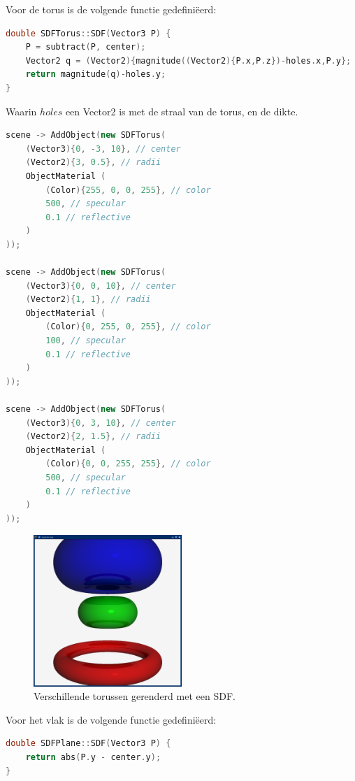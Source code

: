 \documentclass[12pt, a4paper]{article}
\begin{document}
Voor de torus is de volgende functie gedefiniëerd:
\begin{lstlisting}[language=C++]
double SDFTorus::SDF(Vector3 P) {
    P = subtract(P, center);
    Vector2 q = (Vector2){magnitude((Vector2){P.x,P.z})-holes.x,P.y};
    return magnitude(q)-holes.y;
}
\end{lstlisting}

Waarin $holes$ een Vector2 is met de straal van de torus, en de dikte.


\begin{lstlisting}[language=C++]
scene -> AddObject(new SDFTorus(
    (Vector3){0, -3, 10}, // center
    (Vector2){3, 0.5}, // radii
    ObjectMaterial (
        (Color){255, 0, 0, 255}, // color
        500, // specular
        0.1 // reflective
    )
));

scene -> AddObject(new SDFTorus(
    (Vector3){0, 0, 10}, // center
    (Vector2){1, 1}, // radii
    ObjectMaterial (
        (Color){0, 255, 0, 255}, // color
        100, // specular
        0.1 // reflective
    )
));

scene -> AddObject(new SDFTorus(
    (Vector3){0, 3, 10}, // center
    (Vector2){2, 1.5}, // radii
    ObjectMaterial (
        (Color){0, 0, 255, 255}, // color
        500, // specular
        0.1 // reflective
    )
));
\end{lstlisting}

\begin{figure}[h]
    \centering
    \includegraphics[width=0.50\textwidth]{renders/tori.png}
    \caption{Verschillende torussen gerenderd met een SDF.}
    \label{fig:tori}
\end{figure}

Voor het vlak is de volgende functie gedefiniëerd:
\begin{lstlisting}[language=C++]
double SDFPlane::SDF(Vector3 P) {
    return abs(P.y - center.y);
}
\end{lstlisting}
\end{document}
